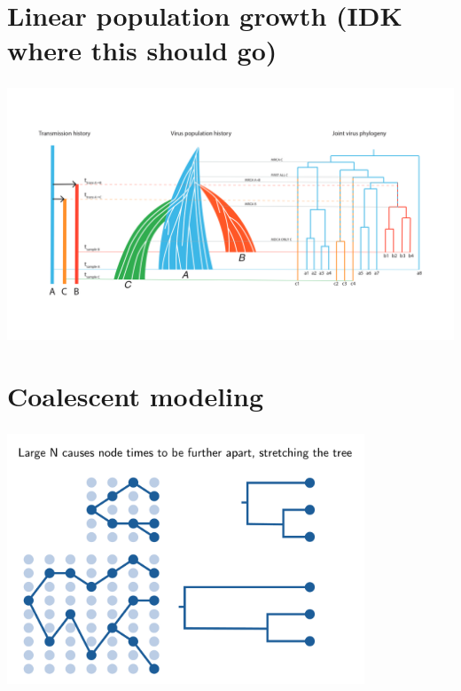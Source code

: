\documentclass[aspectratio=169]{beamer}
\begin{document}
\section{Linear population growth (IDK where this should go)}

\begin{frame} \frametitle{\insertsection}

    \centering\includegraphics[width=\textwidth]{images/thomas-figure}

\end{frame}

\section{Coalescent modeling}

\begin{frame} \frametitle{\insertsection}

        \centering\includegraphics[width=0.8\textwidth]{images/coalescence}

\end{frame}
\end{document}
